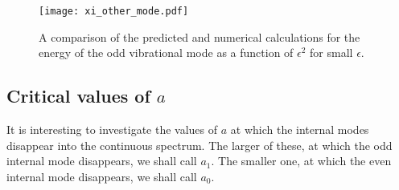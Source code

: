 \begin{figure}
\texttt{[image: xi\_other\_mode.pdf]}
\caption{\label{fig:xi_other_mode}A comparison of the predicted and numerical calculations for the energy of the odd vibrational mode as a function of $\epsilon^2$ for small $\epsilon$.}
\end{figure}


\subsection{Critical values of $a$} \label{sec:a_crit}

It is interesting to investigate the values of $a$ at which the internal modes disappear into the continuous spectrum. The larger of these, at which the odd internal mode disappears, we shall call $a_1$. The smaller one, at which the even internal mode disappears, we shall call $a_0$. %




